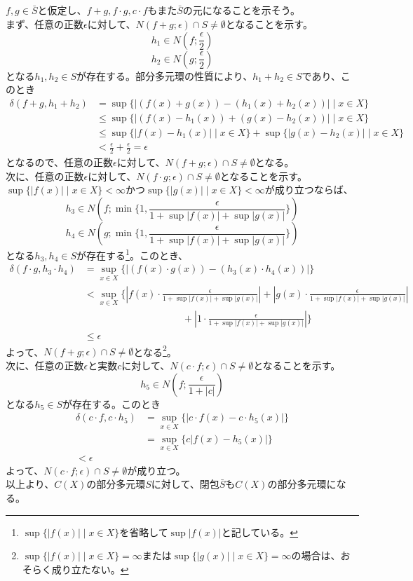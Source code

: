 \documentclass{jsarticle}
\begin{document}
\subsection{}
$f,g\in\bar{S}$と仮定し、$f+g,f\cdot g, c\cdot f$もまた$\bar{S}$の元になることを示そう。\\

まず、任意の正数$\epsilon$に対して、$N(f+g;\epsilon)\cap S\neq\emptyset$となることを示す。
\[h_1\in N(f;\frac{\epsilon}{2})\]
\[h_2\in N(g;\frac{\epsilon}{2})\]
となる$h_1,h_2\in S$が存在する。部分多元環の性質により、$h_1+h_2\in S$であり、このとき
\begin{align*}
\delta(f+g, h_1+h_2)&=\sup\{|(f(x)+g(x))-(h_1(x)+h_2(x))| \mid x\in X\}\\
&\leq \sup\{|(f(x)-h_1(x))+(g(x)-h_2(x))| \mid x\in X\}\\
&\leq \sup\{|f(x)-h_1(x)|\mid x\in X\}+\sup\{|g(x)-h_2(x)| \mid x\in X\}\\
&<\frac{\epsilon}{2}+\frac{\epsilon}{2}=\epsilon
\end{align*}
となるので、任意の正数$\epsilon$に対して、$N(f+g;\epsilon)\cap S\neq\emptyset$となる。\\
次に、任意の正数$\epsilon$に対して、$N(f\cdot g;\epsilon)\cap S\neq\emptyset$となることを示す。
$\sup\{|f(x)|\mid x\in X\}<\infty$かつ$\sup\{|g(x)|\mid x\in X\}<\infty$が成り立つならば、
\[h_3\in N(f;\min\{1,\frac{\epsilon}{1+\sup|f(x)|+\sup|g(x)|}\})\]
\[h_4\in N(g;\min\{1,\frac{\epsilon}{1+\sup|f(x)|+\sup|g(x)|}\})\]
となる$h_3,h_4\in S$が存在する\footnote{$\sup\{|f(x)|\mid x\in X\}$を省略して$\sup|f(x)|$と記している。}。このとき、
\begin{align*}
\delta(f\cdot g, h_3 \cdot h_4)&=\sup_{x\in X}\{|(f(x)\cdot g(x))-(h_3(x) \cdot h_4(x))|\}\\
&< \sup_{x\in X}\{ |f(x)\cdot\frac{\epsilon}{1+\sup|f(x)|+\sup|g(x)|}|+|g(x)\cdot\frac{\epsilon}{1+\sup|f(x)|+\sup|g(x)|}|\\
&\qquad\qquad\qquad\qquad\qquad+|1\cdot\frac{\epsilon}{1+\sup|f(x)|+\sup|g(x)|}|\}\\
&\leq \epsilon
\end{align*}
よって、$N(f+g;\epsilon)\cap S\neq\emptyset$となる\footnote{$\sup\{|f(x)|\mid x\in X\}=\infty$または$\sup\{|g(x)|\mid x\in X\}=\infty$の場合は、おそらく成り立たない。}。\\


次に、任意の正数$\epsilon$と実数$c$に対して、$N(c\cdot f;\epsilon)\cap S\neq\emptyset$となることを示す。
\[h_5\in N(f;\frac{\epsilon}{1+|c|})\]
となる$h_5\in S$が存在する。このとき
\begin{align*}
\delta(c\cdot f, c\cdot h_5)&=\sup_{x\in X}\{|c\cdot f(x)- c\cdot h_5(x)|\}\\
&=\sup_{x\in X}\{c|f(x)-h_5(x)|\}\\
<\epsilon
\end{align*}
よって、$N(c\cdot f;\epsilon)\cap S\neq\emptyset$が成り立つ。\\
以上より、$C(X)$の部分多元環$S$に対して、閉包$\bar{S}$も$C(X)$の部分多元環になる。
\end{document}
